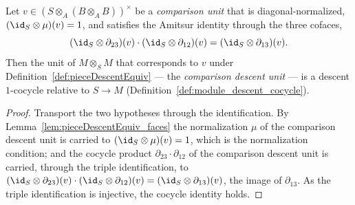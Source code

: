 \begin{theorem}
  \label{thm:isDescentCocycle_comparisonDescentUnit}
  \leanok
  Let \(v \in (S \otimes_A (B \otimes_A B))^{\times}\) be a \emph{comparison unit} that is
  diagonal-normalized, \((\id_S \otimes \mu)(v) = 1\), and satisfies the Amitsur identity through
  the three cofaces,
  \[
    (\id_S \otimes \partial_{23})(v) \cdot (\id_S \otimes \partial_{12})(v) = (\id_S \otimes
    \partial_{13})(v) .
  \]
  Then the unit of \(M \otimes_S M\) that corresponds to \(v\) under
  Definition~\ref{def:pieceDescentEquiv} --- the \emph{comparison descent unit} --- is a descent
  \(1\)-cocycle relative to \(S \to M\) (Definition~\ref{def:module_descent_cocycle}).
\end{theorem}
\begin{proof}
  \leanok
  Transport the two hypotheses through the identification. By
  Lemma~\ref{lem:pieceDescentEquiv_faces} the normalization \(\mu\) of the comparison descent unit
  is carried to \((\id_S \otimes \mu)(v) = 1\), which is the normalization condition; and the
  cocycle product \(\partial_{23} \cdot \partial_{12}\) of the comparison descent unit is carried,
  through the triple identification, to \((\id_S \otimes \partial_{23})(v) \cdot (\id_S \otimes
  \partial_{12})(v) = (\id_S \otimes \partial_{13})(v)\), the image of \(\partial_{13}\). As the
  triple identification is injective, the cocycle identity holds.
\end{proof}

